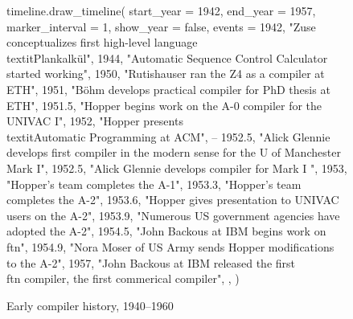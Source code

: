 \pagebreak
\begin{figure}[h]
\begin{luacode}
timeline.draw_timeline({ 
    start_year = 1942,
    end_year = 1957,
    marker_interval = 1,
    show_year = false,
    events = {
        {1942, "Zuse conceptualizes first high-level language \\textit{Plankalkül}"},
        {1944, "Automatic Sequence Control Calculator started working"},
        {1950, "Rutishauser ran the Z4 as a compiler at ETH"},
        {1951, "B{\"o}hm develops practical compiler for PhD thesis at ETH"},
        {1951.5, "Hopper begins work on the A-0 compiler for the UNIVAC I"},
        {1952, "Hopper presents \\textit{Automatic Programming} at ACM"},
        -- {1952.5, "Alick Glennie develops first compiler in the modern sense for the U of Manchester Mark I"},
        {1952.5, "Alick Glennie develops compiler for Mark I "},
        {1953, "Hopper's team completes the A-1"},
        {1953.3, "Hopper's team completes the A-2"},
        {1953.6, "Hopper gives presentation to UNIVAC users on the A-2"},
        {1953.9, "Numerous US government agencies have adopted the A-2"},
        {1954.5, "John Backous at IBM begins work on \\ftn{}"},
        {1954.9, "Nora Moser of US Army sends Hopper modifications to the A-2"},
        {1957, "John Backous at IBM released the first \\ftn{} compiler, the first commerical compiler"},
    },
})
\end{luacode}
\caption{Early compiler history, 1940--1960}
\label{fig:dawn-timeline}
\end{figure}
